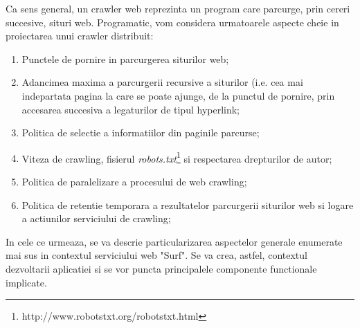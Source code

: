 Ca sens general, un crawler web reprezinta un program care parcurge, prin cereri succesive, situri web. Programatic, vom considera urmatoarele aspecte cheie in proiectarea unui crawler distribuit:

\begin{enumerate}

	\item{Punctele de pornire in parcurgerea siturilor web;}
	
	\item{Adancimea maxima a parcurgerii recursive a siturilor (i.e. cea mai indepartata pagina la care se poate ajunge, de la punctul de pornire, prin accesarea succesiva a legaturilor de tipul hyperlink;}
	
	\item{Politica de selectie a informatiilor din paginile parcurse\cite{web-crawler-selection-policy};}
	
	\item{Viteza de crawling, fisierul \emph{robots.txt}\footnote{http://www.robotstxt.org/robotstxt.html} si respectarea drepturilor de autor;}
	
	\item{Politica de paralelizare a procesului de web crawling;}
	
	\item{Politica de retentie temporara a rezultatelor parcurgerii siturilor web si logare a actiunilor serviciului de crawling;}
	
\end{enumerate}

In cele ce urmeaza, se va descrie particularizarea aspectelor generale enumerate mai sus in contextul serviciului web "Surf". Se va crea, astfel, contextul dezvoltarii aplicatiei si se vor puncta principalele componente functionale implicate.
